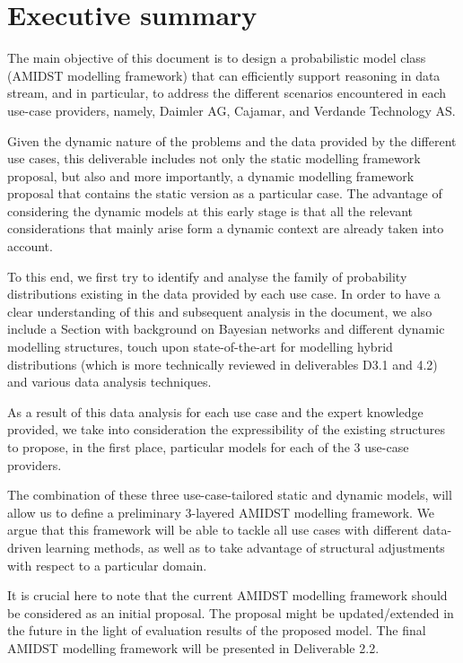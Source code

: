 \section{Executive summary}\label{section:executiveSummary}

The main objective of this document is to design a probabilistic model class (AMIDST modelling framework)  that can efficiently support reasoning in data stream, and in particular, to address the different scenarios encountered in each use-case providers, namely, Daimler AG, Cajamar, and Verdande Technology AS. 

Given the dynamic nature of the problems and the data provided by the different use cases, this deliverable includes not only the static modelling framework proposal, but also and more importantly, a dynamic modelling framework proposal that contains the static version as a particular case. The advantage of considering the dynamic models at this early stage is that all the relevant considerations that mainly arise form a dynamic context are already taken into account.  

To this end, we first try to identify and analyse the family of probability distributions existing in the data provided by each use case. In order to have a clear understanding of this and subsequent analysis in the document, we also include a Section with background on Bayesian networks and different dynamic modelling structures, touch upon state-of-the-art for modelling hybrid distributions (which is more technically reviewed in deliverables D3.1 and 4.2) and various data analysis techniques.

As a result of this data analysis for each use case and the expert knowledge provided, we take into consideration the expressibility of the existing structures to propose, in the first place, particular models for each of the 3 use-case providers.

The combination of these three use-case-tailored static and dynamic models, will allow us to define a preliminary 3-layered AMIDST modelling framework. We argue that this framework will be able to tackle all use cases with different data-driven learning methods, as well as to take advantage of structural adjustments with respect to a particular domain.

It is crucial here to note that the current AMIDST modelling framework should be considered as an initial proposal. The proposal might be updated/extended in the future in the light of evaluation results of the proposed model. The final AMIDST modelling framework will be presented in Deliverable 2.2.


